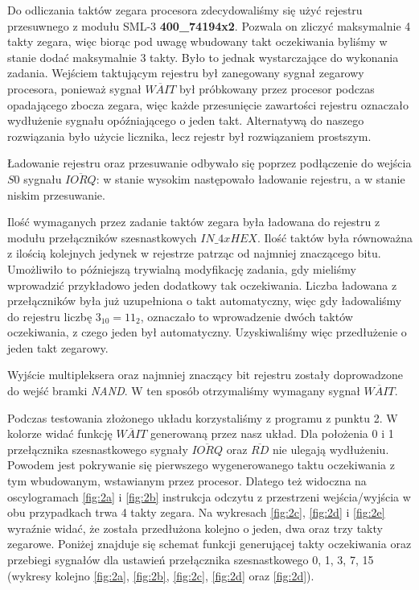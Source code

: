 \documentclass[fleqn]{article}
\newcommand\square[1]{
	\fcolorbox{black}{#1}{\rule{0pt}{6pt}\rule{6pt}{0pt}}
}
\begin{document}
Do odliczania taktów zegara procesora zdecydowaliśmy się użyć rejestru przesuwnego z modułu SML-3 \textbf{400\_74194x2}. Pozwala on zliczyć maksymalnie 4 takty zegara, więc biorąc pod uwagę wbudowany takt oczekiwania byliśmy w stanie dodać maksymalnie 3 takty. Było to jednak wystarczające do wykonania zadania. Wejściem taktującym rejestru był zanegowany sygnał zegarowy procesora, ponieważ sygnał $\overline{WAIT}$ był próbkowany przez procesor podczas opadającego zbocza zegara, więc każde przesunięcie zawartości rejestru oznaczało wydłużenie sygnału opóźniającego o jeden takt. Alternatywą do naszego rozwiązania było użycie licznika, lecz rejestr był rozwiązaniem prostszym.

Ładowanie rejestru oraz przesuwanie odbywało się poprzez podłączenie do wejścia $S0$ sygnału $\overline{IORQ}$: w stanie wysokim następowało ładowanie rejestru, a w stanie niskim przesuwanie.

Ilość wymaganych przez zadanie taktów zegara była ładowana do rejestru z modułu przełączników szesnastkowych ${IN\_4xHEX}$. Ilość taktów była równoważna z ilością kolejnych jedynek w rejestrze patrząc od najmniej znaczącego bitu. Umożliwiło to późniejszą trywialną modyfikację zadania, gdy mieliśmy wprowadzić przykładowo jeden dodatkowy tak oczekiwania. Liczba ładowana z przełączników była już uzupełniona o takt automatyczny, więc gdy ładowaliśmy do rejestru liczbę $3_{10} = 11_2$, oznaczało to wprowadzenie dwóch taktów oczekiwania, z czego jeden był automatyczny. Uzyskiwaliśmy więc przedłużenie o jeden takt zegarowy.

Wyjście multipleksera oraz najmniej znaczący bit rejestru zostały doprowadzone do wejść bramki \textit{NAND}. W ten sposób otrzymaliśmy wymagany sygnał $\overline{WAIT}$.

Podczas testowania złożonego układu korzystaliśmy z programu z punktu 2.  W kolorze \square{blue} widać funkcję $\overline{WAIT}$ generowaną przez nasz układ. Dla położenia 0 i 1 przełącznika szesnastkowego sygnały $\overline{IORQ}$ oraz $\overline{RD}$ nie ulegają wydłużeniu. Powodem jest pokrywanie się pierwszego wygenerowanego taktu oczekiwania z tym wbudowanym, wstawianym przez procesor. Dlatego też widoczna na oscylogramach \ref{fig:2a} i \ref{fig:2b} instrukcja odczytu z przestrzeni wejścia/wyjścia w obu przypadkach trwa 4 takty zegara. Na wykresach \ref{fig:2c}, \ref{fig:2d} i \ref{fig:2e} wyraźnie widać, że została przedłużona kolejno o jeden, dwa oraz trzy takty zegarowe. Poniżej znajduje się schemat funkcji generującej takty oczekiwania oraz przebiegi sygnałów dla ustawień przełącznika szesnastkowego 0, 1, 3, 7, 15 (wykresy kolejno \ref{fig:2a}, \ref{fig:2b}, \ref{fig:2c}, \ref{fig:2d} oraz \ref{fig:2d}).
\end{document}

